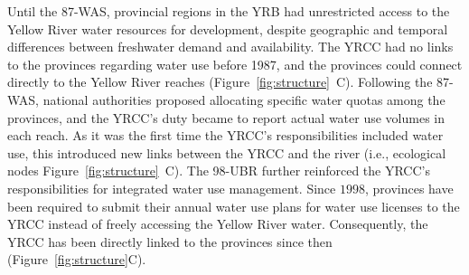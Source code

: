 Until the 87-WAS, provincial regions in the YRB had unrestricted access to the Yellow River water resources for development, despite geographic and temporal differences between freshwater demand and availability.
The YRCC had no links to the provinces regarding water use before 1987, and the provinces could connect directly to the Yellow River reaches (Figure~\ref{fig:structure}~C).
Following the 87-WAS, national authorities proposed allocating specific water quotas among the provinces, and the YRCC's duty became to report actual water use volumes in each reach.
As it was the first time the YRCC's responsibilities included water use, this introduced new links between the YRCC and the river (i.e., ecological nodes Figure~\ref{fig:structure}~C).
The 98-UBR further reinforced the YRCC's responsibilities for integrated water use management.
Since $1998$, provinces have been required to submit their annual water use plans for water use licenses to the YRCC instead of freely accessing the Yellow River water.
Consequently, the YRCC has been directly linked to the provinces since then (Figure~\ref{fig:structure}C).
